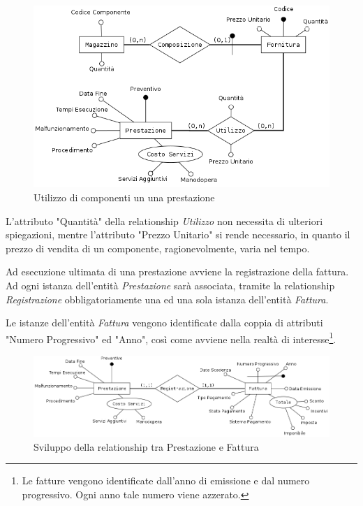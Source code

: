 			\begin{figure}
				\centering
				\includegraphics[width=11.5cm]{images/finitures/prestazione_fornitura.png}
				\caption{Utilizzo di componenti un una prestazione}
				\label{fig:ordine_fornitore}
			\end{figure}
			
			L'attributo "Quantità" della relationship \emph{Utilizzo} non necessita di ulteriori spiegazioni, mentre l'attributo "Prezzo Unitario" si rende necessario, in quanto il prezzo di vendita di un componente, ragionevolmente, varia nel tempo.
			
			Ad esecuzione ultimata di una prestazione avviene la registrazione della fattura. Ad ogni istanza dell'entità \emph{Prestazione} sarà associata, tramite la relationship \emph{Registrazione} obbligatoriamente una ed una sola istanza dell'entità \emph{Fattura}. 		
			
			Le istanze dell'entità \emph{Fattura} vengono identificate dalla coppia di attributi "Numero Progressivo" ed "Anno", così come avviene nella realtà di interesse\footnote{Le fatture vengono identificate dall'anno di emissione e dal numero progressivo. Ogni anno tale numero viene azzerato.}.
			
			\begin{figure}
				\centering
				\includegraphics[width=11.5cm]{images/finitures/prestazione_fattura.png}
				\caption{Sviluppo della relationship tra Prestazione e Fattura}
				\label{fig:prestazione_fattura}
			\end{figure}
			
